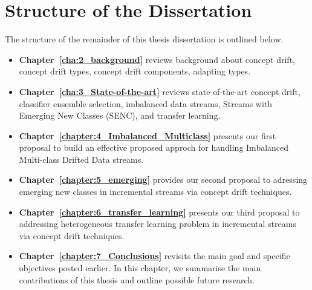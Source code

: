 
\section{Structure of the Dissertation}
\label{sec:1_introduction_organizations}
The structure of the remainder of this thesis dissertation is outlined below.
\begin{itemize}	
	\item \textbf{Chapter~\ref{cha:2_background}} reviews background about concept drift, concept drift types, concept drift components, adapting types.  
	
	\item \textbf{Chapter~\ref{cha:3_State-of-the-art}} reviews state-of-the-art  concept drift, classifier ensemble selection, imbalanced data streams, Streams with Emerging New Classes (SENC), and transfer learning.  
	
	\item \textbf{Chapter~\ref{chapter:4_Imbalanced_Multiclass}
	} presents our first proposal to build an effective proposed approch for  handling Imbalanced Multi-class Drifted Data streams.
	
	\item \textbf{Chapter~\ref{chapter:5_emerging}} provides our second proposal to adressing emerging new classes in incremental streams via concept drift techniques. 
	
	\item \textbf{Chapter~\ref{chapter:6_transfer_learning}} presents our third proposal to addressing heterogeneous transfer learning problem  in incremental streams via concept drift techniques.
	
	\item \textbf{Chapter~\ref{chapter:7_Conclusions}} revisits the main goal and specific objectives posted earlier. In this chapter, we summarise the main contributions of this thesis and outline possible future research.


\end{itemize}